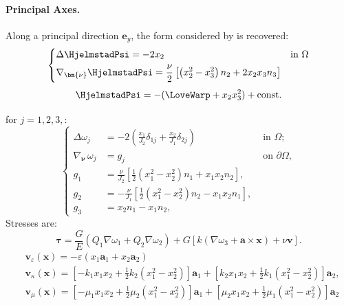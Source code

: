 \paragraph{Principal Axes.}
Along a principal direction \(\mathbf{e}_y\), the form considered by \cite{hjelmstad1983seismic} is recovered:
\begin{equation*}
\left\{
\begin{aligned}
& \Delta \HjelmstadPsi =-2 x_2 \quad &\text{in } \Omega \\
& \nabla_{\bm{\nu}} \HjelmstadPsi=\frac{\nu}{2}\left[\left(x_2^2-x_3^2\right) n_2+2 x_2 x_3 n_3\right]
\end{aligned}
\right.
\end{equation*}
%
\begin{equation*}
\HjelmstadPsi = - (\LoveWarp + x_2 x_3^2) + \text{const.}
\end{equation*}
%
\begin{Quote}

\cite{lacarbonara2007solution} for \(j=1,2,3,\):
\begin{equation*}
\left\{
\begin{aligned}
\Delta \omega_j&=-2\left(\frac{x_1}{J_2} \delta_{1 j}+\frac{x_2}{J_1} \delta_{2 j}\right) &\text { in } \Omega ; \\
\nabla_{\bm{\nu}}\,\omega_j&=g_j &\text { on } \partial \Omega,  \\
%
g_1&=\frac{\nu}{J_2}\left[\frac{1}{2}\left(x_1^2-x_2^2\right) n_1+x_1 x_2 n_2\right], \\
g_2&=-\frac{\nu}{J_1}\left[\frac{1}{2}\left(x_1^2-x_2^2\right) n_2-x_1 x_2 n_1\right], \\ 
g_3&=x_2 n_1-x_1 n_2,
\end{aligned}
\right.
\end{equation*}
Stresses are:
\begin{equation*}
\bm{\tau}=\frac{G}{E}\left(Q_1 \nabla \omega_1+Q_2 \nabla \omega_2\right)
+G\left[k\left(\nabla \omega_3+\mathbf{a} \times \mathbf{x}\right)+\nu \mathbf{v}\right] .
\end{equation*}
\begin{equation*}
\begin{aligned}
& \mathbf{v}_{\varepsilon}(\bm{x})=-\varepsilon\left(x_1 \mathbf{a}_1+x_2 \mathbf{a}_2\right) \\
& \mathbf{v}_\kappa(\bm{x})=\left[-k_1 x_1 x_2+\frac{1}{2} k_2\left(x_1^2-x_2^2\right)\right] \mathbf{a}_1+\left[k_2 x_1 x_2+\frac{1}{2} k_1\left(x_1^2-x_2^2\right)\right] \mathbf{a}_2, \\
& \mathbf{v}_\mu(\bm{x})=\left[-\mu_1 x_1 x_2+\frac{1}{2} \mu_2\left(x_1^2-x_2^2\right)\right] \mathbf{a}_1+\left[\mu_2 x_1 x_2+\frac{1}{2} \mu_1\left(x_1^2-x_2^2\right)\right] \mathbf{a}_2
\end{aligned}
\end{equation*}
\end{Quote}

